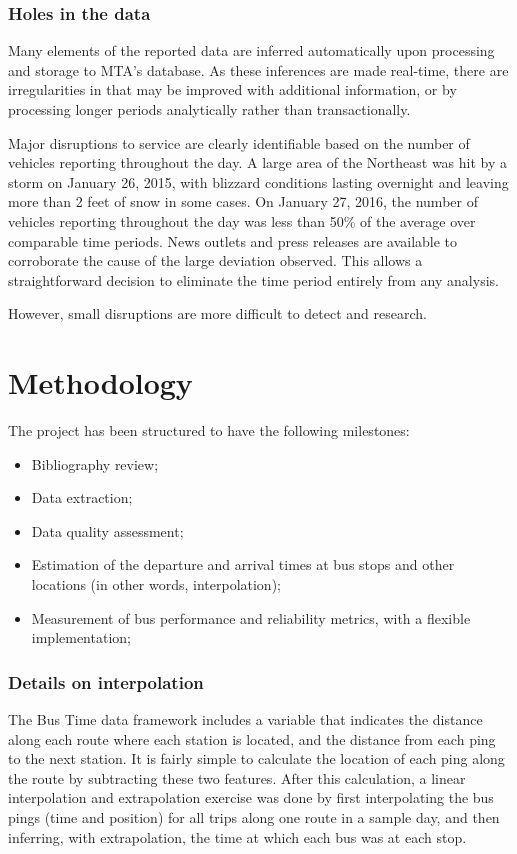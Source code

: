 \documentclass[12pt,journal,compsoc]{IEEEtran}
\begin{document}
\subsubsection{Holes in the data}

Many elements of the reported data are inferred automatically upon processing and storage to MTA’s database.  As these inferences are made real-time, there are irregularities in that may be improved with additional information, or by processing longer periods analytically rather than transactionally.

Major disruptions to service are clearly identifiable based on the number of vehicles reporting throughout the day.  A large area of the Northeast was hit by a storm on January 26, 2015, with blizzard conditions lasting overnight and leaving more than 2 feet of snow in some cases.  On January 27, 2016, the number of vehicles reporting throughout the day was less than 50$\%$ of the average over comparable time periods.  News outlets and press releases are available to corroborate the cause of the large deviation observed.  This allows a straightforward decision to eliminate the time period entirely from any analysis.

However, small disruptions are more difficult to detect and research.

\section{Methodology}

The project has been structured to have the following milestones:


\begin{itemize}
\item  Bibliography review; 
\item Data extraction; 
\item Data quality assessment;
\item Estimation of the departure and arrival times at bus stops and other locations (in other words, interpolation); 
\item Measurement of bus performance and reliability metrics, with a flexible implementation; 
\end{itemize}

\subsubsection{Details on interpolation}

The Bus Time data framework includes a variable that indicates the distance along each route where each station is located, and the distance from each ping to the next station. It is fairly simple to calculate the location of each ping along the route by subtracting these two features. After this calculation, a linear interpolation and extrapolation exercise was done by first interpolating the bus pings (time and position) for all trips along one route in a sample day, and then inferring, with extrapolation, the time at which each bus was at each stop. 
\end{document}
